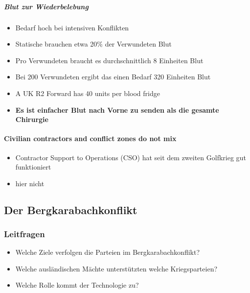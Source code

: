 {}\documentclass[a4paper]{article}
\providecommand{\tightlist}{\setlength{\itemsep}{1mm}\setlength{\parskip}{1mm}}
\begin{document}
\subparagraph{Blut zur Wiederbelebung}\label{blut-zur-wiederbelebung}

\begin{itemize}
	\tightlist
	\item
	      Bedarf hoch bei intensiven Konflikten
	\item
	      Statische brauchen etwa 20\% der Verwundeten Blut
	\item
	      Pro Verwundeten braucht es durchschnittlich 8 Einheiten Blut
	\item
	      Bei 200 Verwundeten ergibt das einen Bedarf 320 Einheiten Blut
	\item
	      A UK R2 Forward has 40 units per blood fridge
	\item
	      \textbf{Es ist einfacher Blut nach Vorne zu senden als die gesamte
		      Chirurgie}
\end{itemize}

\paragraph{Civilian contractors and conflict zones do not
	mix}\label{civilian-contractors-and-conflict-zones-do-not-mix}

\begin{itemize}
	\tightlist
	\item
	      Contractor Support to Operations (CSO) hat seit dem zweiten Golfkrieg
	      gut funktioniert
	\item
	      hier nicht
\end{itemize}

\subsection{Der Bergkarabachkonflikt}\label{der-bergkarabachkonflikt}

\subsubsection{Leitfragen}\label{leitfragen-8}

\begin{itemize}
	\tightlist
	\item
	      Welche Ziele verfolgen die Parteien im Bergkarabachkonflikt?
	\item
	      Welche ausländischen Mächte unterstützten welche Kriegsparteien?
	\item
	      Welche Rolle kommt der Technologie zu?
\end{itemize}
\end{document}
